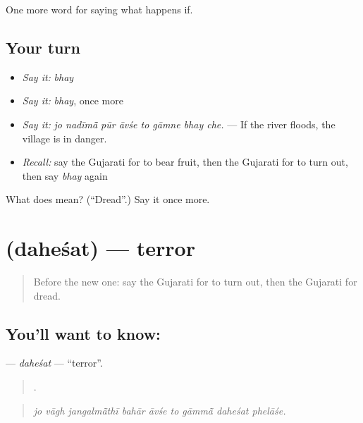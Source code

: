 \begin{grammarlens}[title={What you've built}]
One more word for saying what happens if.
\end{grammarlens}

\subsection*{Your turn}
\begin{itemize}
\raggedright
  \item \emph{Say it:} \emph{bhay}
  \item \emph{Say it:} \emph{bhay}, once more
  \item \emph{Say it:} \emph{jo nadīmā̃ pūr āvśe to gāmne bhay che.} — If the river floods, the village is in danger.
  \item \emph{Recall:} say the Gujarati for to bear fruit, then the Gujarati for to turn out, then say \emph{bhay} again
\end{itemize}

\begin{tcolorbox}[breakable,colback=teal!4,colframe=teal!35!black,title={Before you move on}]
What does  mean? (\textquotedblleft{}Dread\textquotedblright{}.) Say it once more.
\end{tcolorbox}
\section[\texorpdfstring{\gu{દહેશત} (daheśat)}{દહેશત (daheśat)}]{ (daheśat) — terror}

\label{lesson:GU-C369-dahesat}



\begin{quote}
Before the new one: say the Gujarati for to turn out, then the Gujarati for dread.
\end{quote}

\subsection*{You'll want to know: }
\textbf{} — \emph{daheśat} — \textquotedblleft{}terror\textquotedblright{}.

\begin{quote}
        .
\end{quote}

\begin{quote}
\emph{jo vāgh jangalmā̃thī bahār āvśe to gāmmā̃ daheśat phelāśe.}
\end{quote}

